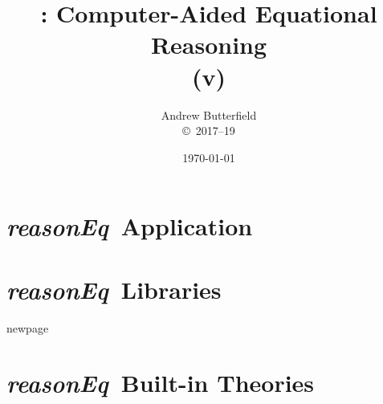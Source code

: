 \documentclass[fleqn,10pt]{report}
\author{
Andrew Butterfield
\\
{\small \copyright\ 2017--19}
}
\title{
  \reasonEq: Computer-Aided Equational Reasoning
  \\(v\reqVersion)
}
\date{
\today
}
\def\reasonEq{\textit{\textsf{reasonEq}}}
\begin{document}
\maketitle
\tableofcontents

\chapter{\reasonEq\ Application}



\chapter{\reasonEq\ Libraries}

%
% 
% 
% 
% 
% 
\newpage

newpage

\newpage

% 
% 
% 
% 
% 
\newpage

% 
% 
\newpage

% 
% 
% 
% 
% 
% 
% 
% 
% 

\chapter{\reasonEq\ Built-in Theories}

% 
% 
% 
% 


%
% 
% 
%
%
% 
% 
% 
% 
%


%
%
%
% 
\end{document}
